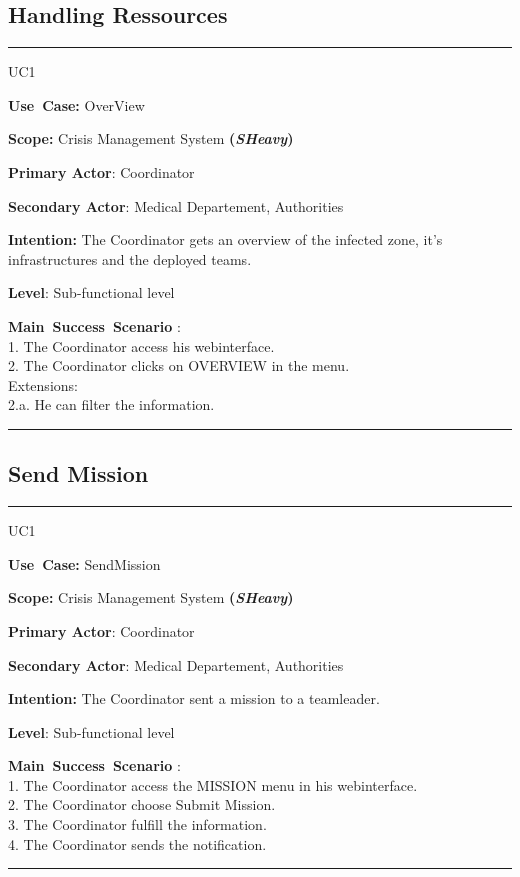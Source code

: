 \subsection{Handling Ressources}
\vspace{0.5cm}
\hrule
\vspace{0.5cm}
\begin{lyxlist}{UC1}
\small{
\item [\textbf{Use~Case:}] OverView
\item [\textbf{Scope:}] Crisis Management System \textbf{(\emph{SHeavy})}
\item [\textbf{Primary Actor}:] Coordinator
\item [\textbf{Secondary Actor}:] Medical Departement, Authorities
\item [\textbf{Intention:}] The Coordinator gets an overview of the infected
zone, it's infrastructures and the deployed teams.
\item [\textbf{Level}:]Sub-functional level
\item [\textbf{Main~Success~Scenario}]:\\
1. The Coordinator access his webinterface.\\
2. The Coordinator clicks on OVERVIEW in the menu.\\
Extensions:\\
	2.a. He can filter the information.\\
}
\end{lyxlist}
\hrule
\vspace{0.5cm} 

\subsection{Send Mission}
\vspace{0.5cm}
\hrule
\vspace{0.5cm}
\begin{lyxlist}{UC1}
\small{
\item [\textbf{Use~Case:}] SendMission
\item [\textbf{Scope:}] Crisis Management System \textbf{(\emph{SHeavy})}
\item [\textbf{Primary Actor}:] Coordinator
\item [\textbf{Secondary Actor}:] Medical Departement, Authorities
\item [\textbf{Intention:}]The Coordinator sent a mission to a teamleader.
\item [\textbf{Level}:]Sub-functional level
\item [\textbf{Main~Success~Scenario}]:\\
1. The Coordinator access the MISSION menu in his webinterface.\\
2. The Coordinator choose Submit Mission.\\
3. The Coordinator fulfill the information.\\
4. The Coordinator sends the notification.\\
}
\end{lyxlist}
\hrule 
\vspace{0.5cm} 

